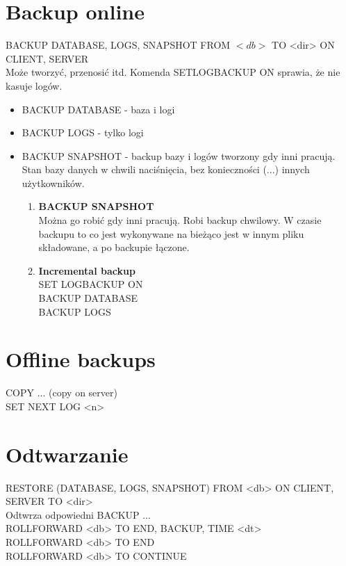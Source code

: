 \documentclass[a4paper,twoside]{article}
\begin{document}
  	\section*{Backup online} \noindent 
  	BACKUP {DATABASE, LOGS, SNAPSHOT} FROM \(<db>\) TO <dir> ON {CLIENT, SERVER}\\
  	Może tworzyć, przenosić itd.
  	Komenda SETLOGBACKUP ON sprawia, że nie kasuje logów.
  	\begin{itemize}
  		\item BACKUP DATABASE - baza i logi
  		\item BACKUP LOGS - tylko logi
  		\item BACKUP SNAPSHOT - backup bazy i logów tworzony gdy inni pracują. Stan bazy danych w chwili naciśnięcia, bez konieczności (...) innych użytkowników.
	  	\begin{enumerate}
	  		\item \textbf{BACKUP SNAPSHOT}\\
	  		Można go robić gdy inni pracują. Robi backup chwilowy. W czasie backupu to co jest wykonywane na bieżąco jest w innym pliku składowane, a po backupie łączone.
	  		\item \textbf{Incremental backup}\\
	  		SET LOGBACKUP ON\\
	  		BACKUP DATABASE\\
	  		BACKUP LOGS
	  	\end{enumerate}
  	\end{itemize}
  	\section*{Offline backups} \noindent 
  	COPY ... (copy on server)\\
  	SET NEXT LOG <n>\\
  	\section*{Odtwarzanie} \noindent 
  	RESTORE (DATABASE, LOGS, SNAPSHOT) FROM <db>  ON {CLIENT, SERVER} TO <dir>\\
  	Odtwrza odpowiedni BACKUP ...\\
  	ROLLFORWARD <db> TO {END, BACKUP, TIME <dt>}\\
  	ROLLFORWARD <db> TO END\\
  	ROLLFORWARD <db> TO CONTINUE
\end{document}
